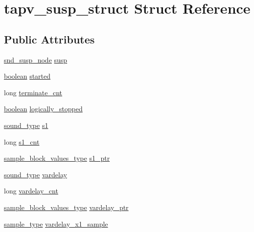 \hypertarget{structtapv__susp__struct}{}\section{tapv\+\_\+susp\+\_\+struct Struct Reference}
\label{structtapv__susp__struct}
\subsection*{Public Attributes}
\begin{DoxyCompactItemize}
\item 
\hyperlink{sound_8h_a6b268203688a934bd798ceb55f85d4c0}{snd\+\_\+susp\+\_\+node} \hyperlink{structtapv__susp__struct_a2deff035fe195348874f1efc855d6bd4}{susp}
\item 
\hyperlink{cext_8h_a7670a4e8a07d9ebb00411948b0bbf86d}{boolean} \hyperlink{structtapv__susp__struct_a561624dfd751cc0747a3fbc15265c004}{started}
\item 
long \hyperlink{structtapv__susp__struct_ad78fc6646af821819a9fecb85f788f49}{terminate\+\_\+cnt}
\item 
\hyperlink{cext_8h_a7670a4e8a07d9ebb00411948b0bbf86d}{boolean} \hyperlink{structtapv__susp__struct_a17eb8ceaf4db0defd3d466bc0215c8ae}{logically\+\_\+stopped}
\item 
\hyperlink{sound_8h_a792cec4ed9d6d636d342d9365ba265ea}{sound\+\_\+type} \hyperlink{structtapv__susp__struct_a7a82567920fd355ecec0815b4f7cb4d7}{s1}
\item 
long \hyperlink{structtapv__susp__struct_a9797765bc6ade05431d2df11fefad83d}{s1\+\_\+cnt}
\item 
\hyperlink{sound_8h_a83d17f7b465d1591f27cd28fc5eb8a03}{sample\+\_\+block\+\_\+values\+\_\+type} \hyperlink{structtapv__susp__struct_a69182c04ac0342dfdb609ccd34162a09}{s1\+\_\+ptr}
\item 
\hyperlink{sound_8h_a792cec4ed9d6d636d342d9365ba265ea}{sound\+\_\+type} \hyperlink{structtapv__susp__struct_a31e78badbf0bdbefc5dbe6e1f5120252}{vardelay}
\item 
long \hyperlink{structtapv__susp__struct_aefe2c6e63778228470af61a38a5cf644}{vardelay\+\_\+cnt}
\item 
\hyperlink{sound_8h_a83d17f7b465d1591f27cd28fc5eb8a03}{sample\+\_\+block\+\_\+values\+\_\+type} \hyperlink{structtapv__susp__struct_a5cf604bd79b54fefa5c5edfebf2df120}{vardelay\+\_\+ptr}
\item 
\hyperlink{sound_8h_a3a9d1d4a1c153390d2401a6e9f71b32c}{sample\+\_\+type} \hyperlink{structtapv__susp__struct_a43b4d7f22d0eabe0957d21fdd5da7d52}{vardelay\+\_\+x1\+\_\+sample}

\end{DoxyCompactItemize}
